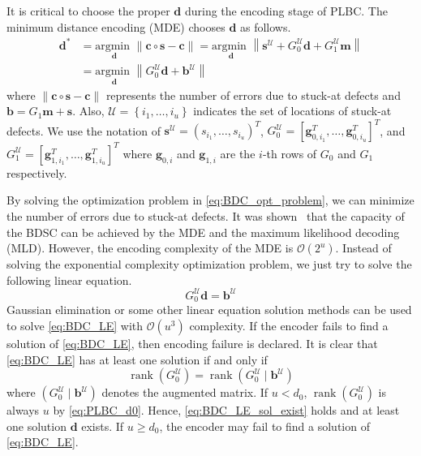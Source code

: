 \documentclass[10pt,twocolumn,twoside,submit]{JCNtran}
\DeclareMathOperator{\rank}{rank}
\begin{document}
	It is critical to choose the proper $\mathbf{d}$ during the encoding stage of PLBC. The minimum distance encoding (MDE) chooses $\mathbf{d}$ as follows. 
	\begin{align}
		\mathbf{d}^* & =\underset{\mathbf{d}}{\text{argmin }} \|\mathbf{c} \circ \mathbf{s} - \mathbf{c} \| =  \underset{\mathbf{d}}{\text{argmin }} \left\| \mathbf{s}^{\mathcal{U}} + G_0^{\mathcal{U}} \mathbf{d} +  G_1^{\mathcal{U}} \mathbf{m}   \right\| \nonumber \\
		&= \underset{\mathbf{d}}{\text{argmin }} \left\| G_0^{\mathcal{U}} \mathbf{d} + \mathbf{b}^{\mathcal{U}} \right\| \label{eq:BDC_opt_problem}
	\end{align}
	where $\| {\mathbf{c}} \circ {\mathbf{s}} - {\mathbf{c}} \|$ represents the number of errors due to stuck-at defects and ${\mathbf{b}} = G_1 {\mathbf{m}} + {\mathbf{s}}$. Also, ${\mathcal{U}}=\left\{i_1,\ldots,i_u \right\}$ indicates the set of locations of stuck-at defects. We use the notation of ${\mathbf{s}}^{\mathcal{U}}=\left(s_{i_1},\ldots,s_{i_u}\right)^T$, $G_0^{\mathcal{U}}=\left[{\mathbf{g}}_{0,i_1}^T,\ldots,{\mathbf{g}}_{0,i_u}^T \right]^T$, and $G_1^{\mathcal{U}}=\left[{\mathbf{g}}_{1,i_1}^T,\ldots,{\mathbf{g}}_{1,i_u}^T \right]^T$ where ${\mathbf{g}}_{0,i}$ and ${\mathbf{g}}_{1,i}$ are the $i$-th rows of $G_0$ and $G_1$ respectively. 
	
	By solving the optimization problem in \eqref{eq:BDC_opt_problem}, we can minimize the number of errors due to stuck-at defects. It was shown~\cite{Heegard1983plbc} that the capacity of the BDSC can be achieved by the MDE and the maximum likelihood decoding (MLD). However, the encoding complexity of the MDE is ${\mathcal{O}}(2^u)$. Instead of solving the exponential complexity optimization problem, we just try to solve the following linear equation.
	\begin{equation}\label{eq:BDC_LE}
	G_0^{\mathcal{U}} {\mathbf{d}} = {\mathbf{b}}^{\mathcal{U}}
	\end{equation}
	Gaussian elimination or some other linear equation solution methods can be used to solve \eqref{eq:BDC_LE} with ${\mathcal{O}}\left(u^3\right)$ complexity. If the encoder fails to find a solution of \eqref{eq:BDC_LE}, then encoding failure is declared. It is clear that \eqref{eq:BDC_LE} has at least one solution if and only if
	\begin{equation} \label{eq:BDC_LE_sol_exist}
	\rank \left( G_0^{\mathcal{U}} \right) = \rank \left( G_0^{\mathcal{U}} \mid \mathbf{b}^{\mathcal{U}} \right)
	\end{equation}
	where $\left( G_0^{\mathcal{U}} \mid \mathbf{b}^{\mathcal{U}} \right)$ denotes the augmented matrix. If $u<d_{0}$, $\rank\left(G_0^{\mathcal{U}}\right)$ is always $u$ by \eqref{eq:PLBC_d0}. Hence, \eqref{eq:BDC_LE_sol_exist} holds and at least one solution $\mathbf{d}$ exists. If $u \ge d_0$, the encoder may fail to find a solution of \eqref{eq:BDC_LE}. 
	
\end{document}

